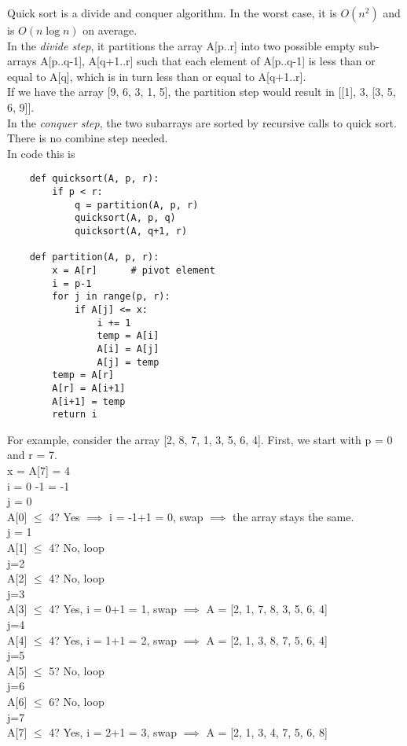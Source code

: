 \documentclass[]{article}
\begin{document}
Quick sort is a divide and conquer algorithm. In the worst case, it is $O(n^2)$ and is $O(n\log n)$ on average. \\

In the \textit{divide step}, it partitions the array A[p..r] into two possible empty sub-arrays A[p..q-1], A[q+1..r] such that each element of A[p..q-1] is less than or equal to A[q], which is in turn less than or equal to A[q+1..r].\\

If we have the array [9, 6, 3, 1, 5], the partition step would result in [[1], 3, [3, 5, 6, 9]]. \\

In the \textit{conquer step}, the two subarrays are sorted by recursive calls to quick sort.\\

There is no combine step needed.\\

In code this is

\begin{lstlisting}
	def quicksort(A, p, r):
		if p < r:
			q = partition(A, p, r)
			quicksort(A, p, q)
			quicksort(A, q+1, r)
	
	def partition(A, p, r):
		x = A[r]      # pivot element
		i = p-1
		for j in range(p, r):
			if A[j] <= x:
				i += 1
				temp = A[i]
				A[i] = A[j]
				A[j] = temp
		temp = A[r]
		A[r] = A[i+1]
		A[i+1] = temp
		return i
\end{lstlisting}\bigbreak

For example, consider the array [2, 8, 7, 1, 3, 5, 6, 4]. First, we start with p = 0 and r = 7. \\

x = A[7] = 4\\
i = 0 -1 = -1\\
j = 0\\
A[0] $\leq$ 4? Yes $\implies$ i = -1+1 = 0, swap $\implies$ the array stays the same.\\
j = 1\\
A[1] $\leq$ 4? No, loop\\
j=2\\
A[2] $\leq$ 4? No, loop\\
j=3\\
A[3] $\leq$ 4? Yes, i = 0+1 = 1, swap $\implies$ A = [2, 1, 7, 8, 3, 5, 6, 4]\\
j=4\\
A[4] $\leq$ 4? Yes, i = 1+1 = 2, swap $\implies$ A = [2, 1, 3, 8, 7, 5, 6, 4]\\
j=5\\
A[5] $\leq$ 5? No, loop\\
j=6\\
A[6] $\leq$ 6? No, loop\\
j=7\\
A[7] $\leq$ 4? Yes, i = 2+1 = 3, swap $\implies$ A = [2, 1, 3, 4, 7, 5, 6, 8]\\
\end{document}
